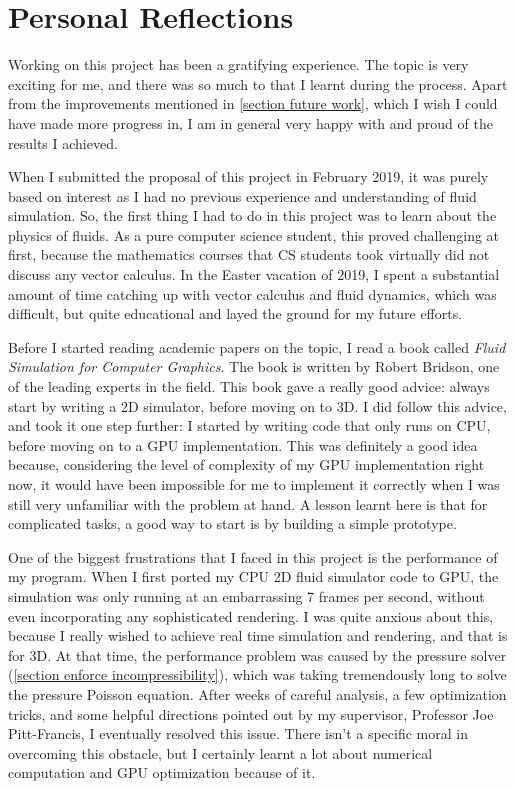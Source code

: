 \section{Personal Reflections}
Working on this project has been a gratifying experience. The topic is very exciting for me, and there was so much to that I learnt during the process. Apart from the improvements mentioned in \ref{section future work}, which I wish I could have made more progress in, I am in general very happy with and proud of the results I achieved.

When I submitted the proposal of this project in February 2019, it was purely based on interest as I had no previous experience and understanding of fluid simulation. So, the first thing I had to do in this project was to learn about the physics of fluids. As a pure computer science student, this proved challenging at first, because the mathematics courses that CS students took virtually did not discuss any vector calculus. In the Easter vacation of 2019, I spent a substantial amount of time catching up with vector calculus and fluid dynamics, which was difficult, but quite educational and layed the ground for my future efforts.

Before I started reading academic papers on the topic, I read a book called \textit{Fluid Simulation for Computer Graphics}\cite{bridson2015fluid}. The book is written by Robert Bridson, one of the leading experts in the field. This book gave a really good advice: always start by writing a 2D simulator, before moving on to 3D. I did follow this advice, and took it one step further: I started by writing code that only runs on CPU, before moving on to a GPU implementation. This was definitely a good idea because, considering the level of complexity of my GPU implementation right now, it would have been impossible for me to implement it correctly when I was still very unfamiliar with the problem at hand. A lesson learnt here is that for complicated tasks, a good way to start is by building a simple prototype.

One of the biggest frustrations that I faced in this project is the performance of my program. When I first ported my CPU 2D fluid simulator code to GPU, the simulation was only running at an embarrassing 7 frames per second, without even incorporating any sophisticated rendering. I was quite anxious about this, because I really wished to achieve real time simulation and rendering, and that is for 3D. At that time, the performance problem was caused by the pressure solver (\ref{section enforce incompressibility}), which was taking tremendously long to solve the pressure Poisson equation. After weeks of careful analysis, a few optimization tricks, and some helpful directions pointed out by my supervisor, Professor Joe Pitt-Francis, I eventually resolved this issue. There isn't a specific moral in overcoming this obstacle, but I certainly learnt a lot about numerical computation and GPU optimization because of it.

